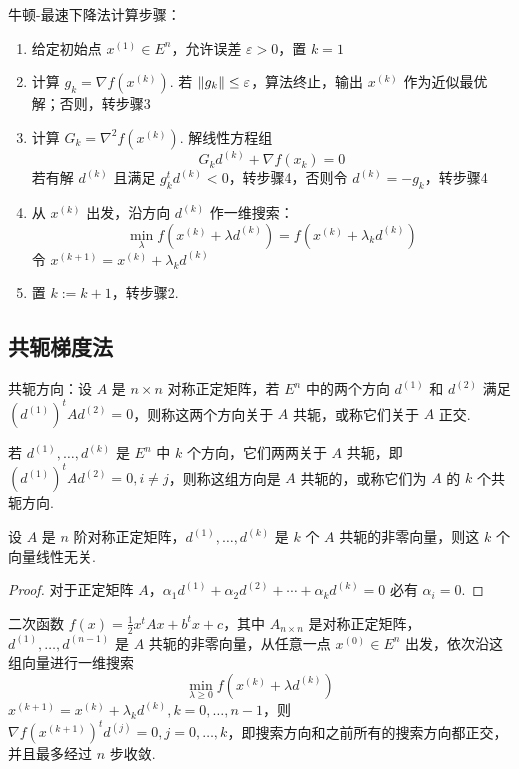 \begin{remark}
    牛顿-最速下降法计算步骤：\begin{enumerate}
        \item 给定初始点 $x^{(1)} \in E^n$，允许误差 $\varepsilon > 0$，置 $k = 1$
        \item 计算 $g_k = \nabla f(x^{(k)})$. 若 $\norm{g_k} \le \varepsilon$，算法终止，输出 $x^{(k)}$ 作为近似最优解；否则，转步骤3
        \item 计算 $G_k = \nabla^2f(x^{(k)})$. 解线性方程组\[G_kd^{(k)} + \nabla f(x_k) = 0\] 若有解 $d^{(k)}$ 且满足 $g_k^td^{(k)} < 0$，转步骤4，否则令 $d^{(k)} = -g_k$，转步骤4
        \item 从 $x^{(k)}$ 出发，沿方向 $d^{(k)}$ 作一维搜索：\[\min_{\lambda} f(x^{(k)} + \lambda d^{(k)}) = f(x^{(k)} + \lambda_k d^{(k)})\] 令 $x^{(k + 1)} = x^{(k)} + \lambda_k d^{(k)}$
        \item 置 $k := k + 1$，转步骤2.
    \end{enumerate}
\end{remark}

\subsection{共轭梯度法}
\begin{remark}
    共轭方向：设 $A$ 是 $n \times n$ 对称正定矩阵，若 $E^n$ 中的两个方向 $d^{(1)}$ 和 $d^{(2)}$ 满足 $(d^{(1)})^tAd^{(2)} = 0$，则称这两个方向关于 $A$ 共轭，或称它们关于 $A$ 正交.

    若 $d^{(1)}, \dots, d^{(k)}$ 是 $E^n$ 中 $k$ 个方向，它们两两关于 $A$ 共轭，即 $(d^{(1)})^tAd^{(2)} = 0, i \neq j$，则称这组方向是 $A$ 共轭的，或称它们为 $A$ 的 $k$ 个共轭方向.
\end{remark}

\begin{theorem}
    设 $A$ 是 $n$ 阶对称正定矩阵，$d^{(1)}, \dots, d^{(k)}$ 是 $k$ 个 $A$ 共轭的非零向量，则这 $k$ 个向量线性无关.
    \begin{proof}
        对于正定矩阵 $A$，$\alpha_{1} d^{(1)}+\alpha_{2} d^{(2)}+\cdots+\alpha_{k} d^{(k)}=0$ 必有 $\alpha_i = 0$.
    \end{proof}
\end{theorem}

\begin{theorem}
    二次函数 $f(x) = \frac{1}{2}x^tAx + b^tx + c$，其中 $A_{n \times n}$ 是对称正定矩阵，$d^{(1)}, \dots, d^{(n - 1)}$ 是 $A$ 共轭的非零向量，从任意一点 $x^{(0)} \in E^n$ 出发，依次沿这组向量进行一维搜索\[\underset{\lambda \ge 0}{\min} f(x^{(k)} + \lambda d^{(k)})\]$x^{(k + 1)} = x^{(k)} + \lambda_k d^{(k)}, k = 0, \dots, n - 1$，则 $\nabla f(x^{(k + 1)})^t d^{(j)} = 0, j = 0, \dots, k$，即搜索方向和之前所有的搜索方向都正交，并且最多经过 $n$ 步收敛.
\end{theorem}


